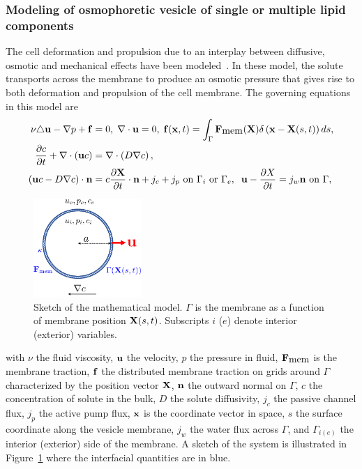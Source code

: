 \documentclass[11pt]{article}
\begin{document}
\subsubsection{Modeling of osmophoretic vesicle of single or multiple lipid components\label{subsubsec:aim1_math}}
The cell deformation and propulsion due to an interplay between
diffusive, osmotic and mechanical effects have been
modeled~\cite{Blount2012_PRE, Vogl2014_JRSInterface, YaoMori2017_JCP}.
In these model, the solute transports across the membrane to produce an
osmotic pressure that gives rise to both deformation and propulsion of
the cell membrane. The governing equations in this model are
\begin{align}
\nu \triangle {\bf u} - \nabla p + {\bf f} &=0, \;\nabla\cdot{\bf u} = 0, \; {\bf f}({\bf x},t) = \int_{\Gamma}{\bf F}_{\mbox{mem}}({\bf X})\delta\left({\bf x}-{\bf X}(s,t)\right)ds,\\
\frac{\partial c}{\partial t} + \nabla\cdot\left({\bf u} c\right) &= \nabla\cdot\left(D\nabla c\right),\\
\left({\bf u} c-D\nabla c\right)\cdot{\bf n} &= c\frac{\partial {\bf X}}{\partial t}\cdot{\bf n}+j_c+j_p \mbox{ on } \Gamma_i \mbox{ or } \Gamma_e,\;\;{\bf u} - \frac{\partial X}{\partial t} = j_w {\bf n} \mbox{ on } \Gamma,
\end{align}
\begin{figure}
\vspace*{-10pt}
\centerline{\includegraphics[width=1.6in]{figs/math_model_illustrate.pdf}}
\caption{\label{fig:math_model_illustration} Sketch of the mathematical
  model. $\Gamma$ is the membrane as a function of membrane position
  ${\bf X}(s,t)$. Subscripts $i$ ($e$) denote interior (exterior)
  variables.}
\end{figure}
%
with $\nu$ the fluid viscosity,  ${\bf u}$ the velocity, $p$ the
pressure in fluid, ${\bf F}_{\mbox{mem}}$ is the membrane traction,
${\bf f}$ the distributed membrane traction on grids around $\Gamma$
characterized by the position vector ${\bf X}$, ${\bf n}$ the outward
normal on $\Gamma$, $c$ the concentration of solute in the bulk, $D$ the
solute diffusivity, $j_c$ the passive channel flux, $j_p$ the active
pump flux, ${\bf x}$ is the coordinate vector in space, $s$ the surface
coordinate along the vesicle membrane, $j_w$ the water flux across
$\Gamma$, and $\Gamma_{i(e)}$ the interior (exterior) side of the
membrane.  A sketch of the system is illustrated in
Figure~\ref{fig:math_model_illustration} where the interfacial
quantities are in blue.
\end{document}
